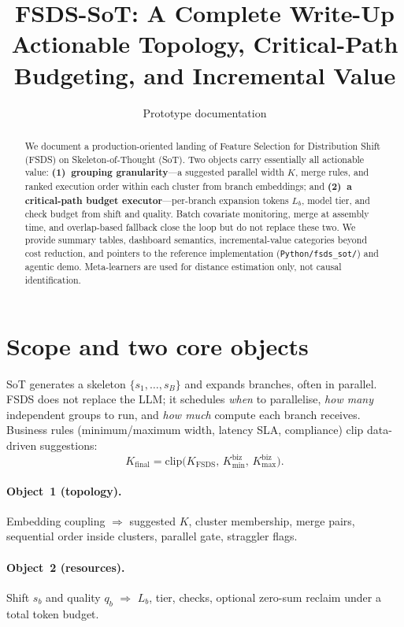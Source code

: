 \documentclass[11pt]{article}
\title{\bf FSDS-SoT: A Complete Write-Up\\[0.4em]
\large Actionable Topology, Critical-Path Budgeting, and Incremental Value}
\author{Prototype documentation}
\date{}
\begin{document}
\maketitle

\begin{abstract}
We document a production-oriented landing of Feature Selection for Distribution
Shift (FSDS) on Skeleton-of-Thought (SoT). Two objects carry essentially all
actionable value: \textbf{(1)~grouping granularity}---a suggested parallel width
$K$, merge rules, and ranked execution order within each cluster from branch
embeddings; and \textbf{(2)~a critical-path budget executor}---per-branch
expansion tokens $L_b$, model tier, and check budget from shift and quality.
Batch covariate monitoring, merge at assembly time, and overlap-based fallback
close the loop but do not replace these two. We provide summary tables, dashboard
semantics, incremental-value categories beyond cost reduction, and pointers to
the reference implementation (\texttt{Python/fsds\_sot/}) and agentic demo.
Meta-learners are used for distance estimation only, not causal identification.
\end{abstract}

\section{Scope and two core objects}
\label{sec:scope}

SoT generates a skeleton $\{s_1,\ldots,s_B\}$ and expands branches, often in
parallel. FSDS does not replace the LLM; it schedules \emph{when} to parallelise,
\emph{how many} independent groups to run, and \emph{how much} compute each
branch receives. Business rules (minimum/maximum width, latency SLA, compliance)
clip data-driven suggestions:
\begin{equation}
  K_{\mathrm{final}} = \mathrm{clip}\big(K_{\mathrm{FSDS}},\, K_{\min}^{\mathrm{biz}},\, K_{\max}^{\mathrm{biz}}\big).
\end{equation}

\paragraph{Object~1 (topology).} Embedding coupling $\Rightarrow$ suggested $K$,
cluster membership, merge pairs, sequential order inside clusters, parallel gate,
straggler flags.

\paragraph{Object~2 (resources).} Shift $s_b$ and quality $q_b$ $\Rightarrow$
$L_b$, tier, checks, optional zero-sum reclaim under a total token budget.
\end{document}
